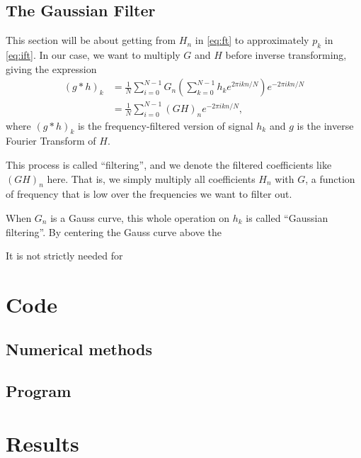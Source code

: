 \documentclass[12pt,a4paper]{article}
\begin{document}
\subsection{The Gaussian Filter}\label{sec:gauss}
This section will be about getting from $H_n$ in \eqref{eq:ft}
to approximately $p_k$ in \eqref{eq:ift}.
In our case, we want to multiply $G$ and $H$ before inverse transforming,
giving the expression
\begin{align}
  (g*h)_k &= \frac1N\sum_{i=0}^{N-1}G_n(\sum_{k=0}^{N-1} h_ke^{2\pi ikn/N})e^{-2\pi ikn/N}\\
          &= \frac1N\sum_{i=0}^{N-1}(GH)_ne^{-2\pi ikn/N},
\end{align}
where $(g*h)_k$ is the frequency-filtered version of signal $h_k$ and $g$
is the inverse Fourier Transform of $H$.

This process is called ``filtering'', and we denote the
filtered coefficients like $(GH)_n$ here.%
That is, we simply multiply all coefficients $H_n$ with
$G$, a function of frequency that is low over the
frequencies we want to filter out.

When $G_n$ is a Gauss curve, this whole operation on $h_k$ is called ``Gaussian filtering''.
By centering the Gauss curve above the 

It is not strictly needed for 



\section{Code}\label{sec:code}

\subsection{Numerical methods}\label{sec:nm}

\subsection{Program}

\section{Results}\label{sec:results}
\end{document}
